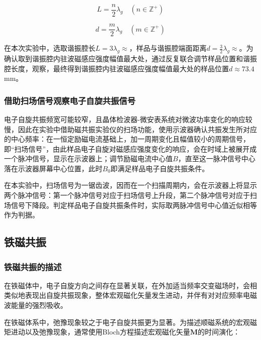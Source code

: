 \documentclass{thuemp}
\begin{document}
    \begin{equation}
    L = \frac{n}{2}\lambda_g \quad (n \in \mathbb{Z}^+)
    \end{equation}
    
    \begin{equation}
    d = \frac{m}{2}\lambda_g \quad (m \in \mathbb{Z}^+)
    \end{equation}
    
    在本次实验中，选取谐振腔长$L=3\lambda_g\approx$，样品与谐振腔端面距离$d=\frac{3}{2}\lambda_g\approx$。为确认取到谐振腔内驻波磁感应强度幅值最大处，通过反复联合调节样品位置和谐振腔长度，观察，最终得到谐振腔内驻波磁感应强度幅值最大处的样品位置$d \approx 73.4 $\si{\milli\meter}。
    
    \subsubsection{借助扫场信号观察电子自旋共振信号}
    
    电子自旋共振频宽可能较窄，且晶体检波器-微安表系统对微波功率变化的响应较慢，因此在实验中借助磁共振实验仪的扫场功能，使用示波器确认共振发生所对应的中心频率：在一恒定励磁电流基础上，加一周期变化且幅值较小的周期信号，即“扫场信号”，由此样品电子自旋对磁感应强度变化的响应，会在时域上被展开成一个脉冲信号，显示在示波器上；调节励磁电流中心值$B$，直至这一脉冲信号中心落在示波器屏幕中心位置，此时$B_0$即满足样品电子自旋共振条件。
    
    在本实验中，扫场信号为一锯齿波，因而在一个扫描周期内，会在示波器上将显示两个脉冲信号：第一个脉冲信号对应于扫场信号上升段，第二个脉冲信号对应于扫场信号下降段。判定样品电子自旋共振条件时，实际取两脉冲信号中心值近似相等作为判据。
    
    \subsection{铁磁共振}
    
    \subsubsection{铁磁共振的描述}
    
    在铁磁体中，电子自旋方向之间存在显著关联，在外加适当频率交变磁场时，会相类似地表现出自旋共振现象，整体宏观磁化矢量发生进动，并伴有对对应频率电磁波能量的强烈吸收。
    
    在铁磁体系中，弛豫现象较之于电子自旋共振更为显著。为描述顺磁系统的宏观磁矩进动以及弛豫现象，通常使用Bloch方程描述宏观磁化矢量$\symbf{M}$的时间演化：
    
\end{document}
